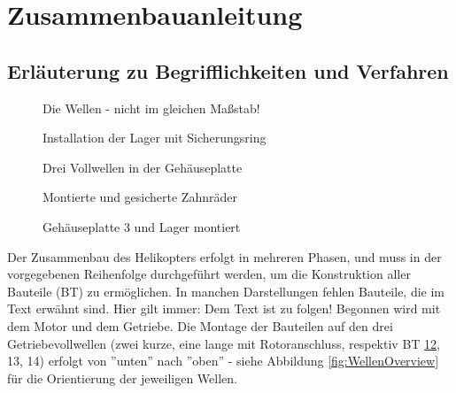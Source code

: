 \documentclass[10pt, a4paper]{article}
\newcommand{\CaptSpac}{-10pt}
\begin{document}
\setlength{\fboxsep}{0pt}%
\setlength{\fboxrule}{1pt}%

\tableofcontents

\section{Zusammenbauanleitung\label{AnleitungMain}}
\subsection{Erläuterung zu Begrifflichkeiten und Verfahren}
\begin{wrapfigure}{r}{0.31\textwidth}  
  \vspace{-12pt}
  \vspace{\CaptSpac}
  \caption{\label{fig:WellenOverview}Die Wellen - nicht im gleichen Maßstab!}
  \vspace{\CaptSpac}
  \caption{\label{fig:Bauschritt1}Installation der Lager mit Sicherungsring}
  \vspace{\CaptSpac}
  \caption{\label{fig:Bauschritt2}Drei Vollwellen in der Gehäuseplatte} 
  \vspace{\CaptSpac}
  \caption{\label{fig:Bauschritt3}Montierte und gesicherte Zahnräder}
  \vspace{\CaptSpac}
  \caption{\label{fig:Bauschritt4}Gehäuseplatte 3 und Lager montiert}
  \vspace{-80pt}
\end{wrapfigure}
Der Zusammenbau des Helikopters erfolgt in mehreren Phasen, und muss in der vorgegebenen Reihenfolge durchgeführt werden, um die Konstruktion aller Bauteile (BT) zu ermöglichen. In manchen Darstellungen fehlen Bauteile, die im Text erwähnt sind. Hier gilt immer: Dem Text ist zu folgen! 
Begonnen wird mit dem Motor und dem Getriebe. Die Montage der Bauteilen auf den drei Getriebevollwellen (zwei kurze, eine lange mit Rotoranschluss, respektiv BT \hyperlink{Welle1}{12}, 13, 14) \allowbreak erfolgt von ''unten'' nach ''oben'' - siehe Abbildung \ref{fig:WellenOverview} für die Orientierung der jeweiligen \allowbreak Wellen.
\end{document}
